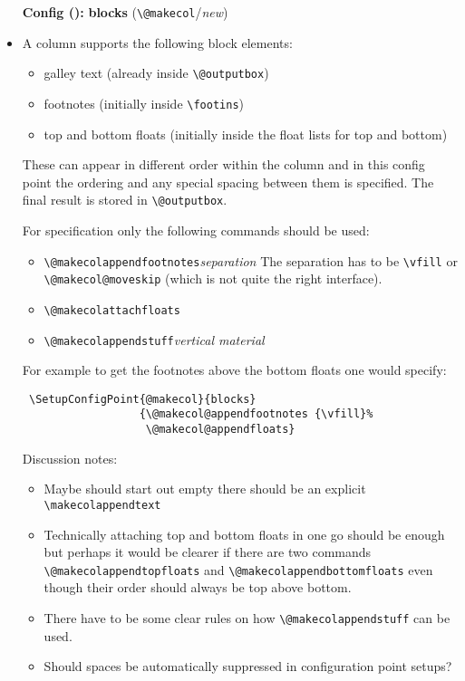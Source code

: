 \documentclass{article}
\newcounter{config}
\newenvironment{config}[3][new]  %
   {\refstepcounter{config}%
    \begin{itemize}%
    \item[\textbf{Config (\theconfig):}]\textbf{#3} (#2/\textit{#1})}
   {\end{itemize}}
\newcommand\cs[1]{\texttt{\textbackslash #1}}
\renewcommand\arg[1]{\textit{#1}}      %
\begin{document}
\begin{config}{\cs{@makecol}}{blocks}
\item
  A column supports the following block elements:
  \begin{itemize}
  \item
    galley text (already inside \cs{@outputbox})
  \item
    footnotes (initially inside \cs{footins})
  \item
    top and bottom floats (initially inside the \LaTeXe{} float lists
    for top and bottom)
  \end{itemize}
  These can appear in different order within the column and in this
  config point the ordering and any special spacing between them is
  specified. The final result is stored in \cs{@outputbox}.

  For specification only the following commands should be used:
  \begin{itemize}
  \item \cs{@makecolappendfootnotes}\arg{separation} The separation
    has to be \cs{vfill} or \cs{@makecol@moveskip} (which is not
    quite the right interface).
  \item \cs{@makecolattachfloats}
  \item \cs{@makecolappendstuff}\arg{vertical material}
  \end{itemize}
  For example to get the footnotes above the bottom floats one would specify:
\begin{verbatim}
 \SetupConfigPoint{@makecol}{blocks}
                  {\@makecol@appendfootnotes {\vfill}%
                   \@makecol@appendfloats}
\end{verbatim}


  Discussion notes:
  \begin{itemize}
  \item
    Maybe \@outputbox{} should start out empty there should be an
    explicit \cs{makecolappendtext}
  \item
    Technically attaching top and bottom floats in one go should be
    enough but perhaps it would be clearer if there are two commands
    \cs{@makecolappendtopfloats} and \cs{@makecolappendbottomfloats}
    even though their order should always be top above bottom.
  \item
    There have to be some clear rules on how \cs{@makecolappendstuff}
    can be used.
  \item
    Should spaces be automatically suppressed in configuration point setups?
  \end{itemize}
\end{config}
\end{document}
